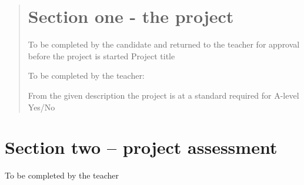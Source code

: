 \documentclass[
]{article}
\begin{document}
\begin{quote}
  \section{Section one - the project}\label{section-one-the-project}

To be completed by the candidate and returned to the teacher for
approval before the project is started Project title      

To be completed by the teacher:

From the given description the project is at a standard required for
A-level Yes/No
\end{quote}

\hypertarget{section-two-project-assessment}{%
\section{Section two -- project
assessment}\label{section-two-project-assessment}}

To be completed by the teacher
\end{document}
